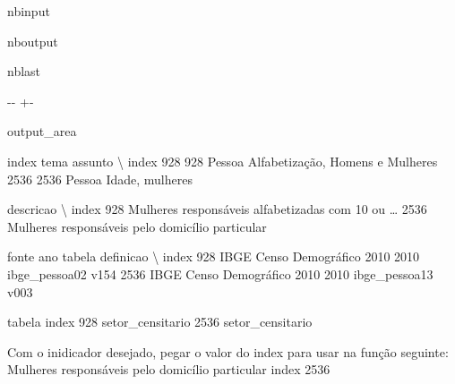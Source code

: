 \documentclass[letterpaper,10pt,brazil]{sphinxmanual}
\newlength\nbsphinxcodecellspacing
\begin{document}
\begin{sphinxuseclass}{nbinput}
{
\begin{sphinxVerbatim}[commandchars=\\\{\}]
\llap{\color{nbsphinxin}[3]:\,\hspace{\fboxrule}\hspace{\fboxsep}}  
\end{sphinxVerbatim}
}

\end{sphinxuseclass}
\begin{sphinxuseclass}{nboutput}
\begin{sphinxuseclass}{nblast}
{

\kern-\sphinxverbatimsmallskipamount\kern-\baselineskip
\kern+\FrameHeightAdjust\kern-\fboxrule
\vspace{\nbsphinxcodecellspacing}

\begin{sphinxuseclass}{output_area}
\begin{sphinxuseclass}{}


\begin{sphinxVerbatim}[commandchars=\\\{\}]
\llap{\color{nbsphinxout}[3]:\,\hspace{\fboxrule}\hspace{\fboxsep}}       index    tema                           assunto  \textbackslash{}
index
928      928  Pessoa  Alfabetização, Homens e Mulheres
2536    2536  Pessoa                   Idade, mulheres

                                               descricao  \textbackslash{}
index
928    Mulheres responsáveis alfabetizadas com 10 ou {\ldots}
2536     Mulheres responsáveis pelo domicílio particular

                             fonte   ano         tabela definicao  \textbackslash{}
index
928    IBGE Censo Demográfico 2010  2010  ibge\_pessoa02      v154
2536   IBGE Censo Demográfico 2010  2010  ibge\_pessoa13      v003

                 tabela
index
928    setor\_censitario
2536   setor\_censitario
\end{sphinxVerbatim}



\end{sphinxuseclass}
\end{sphinxuseclass}
}

\end{sphinxuseclass}
\end{sphinxuseclass}
\sphinxAtStartPar
Com o inidicador desejado, pegar o valor do index para usar na função seguinte: \sphinxhyphen{} Mulheres responsáveis pelo domicílio particular \sphinxhyphen{} index 2536
\end{document}
